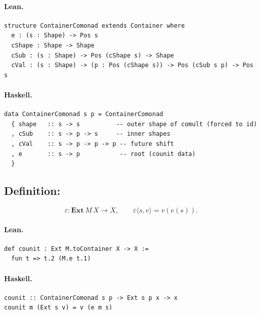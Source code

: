\documentclass[11pt,a4paper]{article}
\begin{document}
\paragraph{Lean.}
\begin{lstlisting}[style=lean]
structure ContainerComonad extends Container where
  e : (s : Shape) -> Pos s
  cShape : Shape -> Shape
  cSub : (s : Shape) -> Pos (cShape s) -> Shape
  cVal : (s : Shape) -> (p : Pos (cShape s)) -> Pos (cSub s p) -> Pos s
\end{lstlisting}

\paragraph{Haskell.}
\begin{lstlisting}[style=haskell]
data ContainerComonad s p = ContainerComonad
  { shape   :: s -> s          -- outer shape of comult (forced to id)
  , cSub    :: s -> p -> s     -- inner shapes
  , cVal    :: s -> p -> p -> p -- future shift
  , e       :: s -> p           -- root (counit data)
  }
\end{lstlisting}


\subsection{Definition: }

\begin{defn}[Counit]
\[
  \varepsilon : \mathbf{Ext}\,M\,X \to X, \qquad
  \varepsilon\langle s, v \rangle = v(e(s)).
\]
\end{defn}

\paragraph{Lean.}
\begin{lstlisting}[style=lean]
def counit : Ext M.toContainer X -> X :=
  fun t => t.2 (M.e t.1)
\end{lstlisting}

\paragraph{Haskell.}
\begin{lstlisting}[style=haskell]
counit :: ContainerComonad s p -> Ext s p x -> x
counit m (Ext s v) = v (e m s)
\end{lstlisting}
\end{document}
